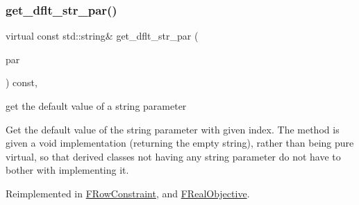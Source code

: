 \mbox{\label{class_s_m_spp__di__unipi__it_1_1_thin_compute_interface_a0b058687744cfc2e91a20187c56566ca}} 
\subsubsection{\texorpdfstring{get\+\_\+dflt\+\_\+str\+\_\+par()}{get\_dflt\_str\_par()}}
{\footnotesize\ttfamily virtual const std\+::string\& get\+\_\+dflt\+\_\+str\+\_\+par (\begin{DoxyParamCaption}\item[{const \mbox{\hyperlink{class_s_m_spp__di__unipi__it_1_1_thin_compute_interface_aa3d710629ad8c434286726ad810c3b47}{idx\+\_\+type}}}]{par }\end{DoxyParamCaption}) const\hspace{0.3cm}{\ttfamily [inline]}, {\ttfamily [virtual]}}



get the default value of a string parameter 

Get the default value of the string parameter with given index. The method is given a void implementation (returning the empty string), rather than being pure virtual, so that derived classes not having any string parameter do not have to bother with implementing it. 

Reimplemented in \mbox{\hyperlink{class_s_m_spp__di__unipi__it_1_1_f_row_constraint_a4d332ec2a836a87b0bd3b3539752e89f}{F\+Row\+Constraint}}, and \mbox{\hyperlink{class_s_m_spp__di__unipi__it_1_1_f_real_objective_a4d332ec2a836a87b0bd3b3539752e89f}{F\+Real\+Objective}}.

\mbox{\label{class_s_m_spp__di__unipi__it_1_1_thin_compute_interface_a9403da6fd83a275dfdf21ec4db71c744}} 
